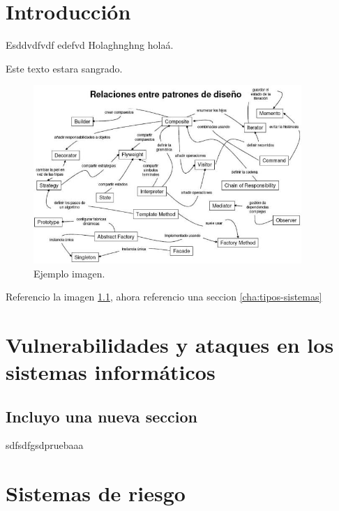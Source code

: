 \chapter{Introducción}
\label{cha:introduccion}


Esddvdfvdf \cite{ejemplo} edefvd Holaghnghng holaá.

Este texto estara sangrado.

\begin{figure}[tphb]
  \centering
  \includegraphics[width=4in]{ejemplo-imagen.jpg}
  \caption{Ejemplo imagen.}
  \label{img:imagen-ejemplo}
\end{figure}

Referencio la imagen \ref{img:imagen-ejemplo}, ahora referencio una seccion \ref{cha:tipos-sistemas}


\chapter{Vulnerabilidades y ataques en los sistemas informáticos}
\label{cha:vulneravilidades-y-ataques}

\section{Incluyo una nueva seccion}
\label{sec:prueba}
sdfsdfgsdpruebaaa



\chapter{Sistemas de riesgo}
\label{cha:sistemas-de-riesgo}





